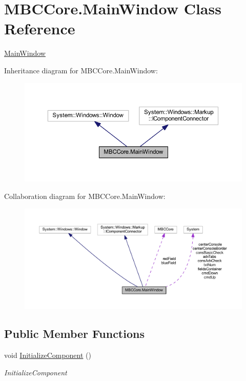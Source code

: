 \hypertarget{class_m_b_c_core_1_1_main_window}{\section{M\-B\-C\-Core.\-Main\-Window Class Reference}
\label{class_m_b_c_core_1_1_main_window}
}


\hyperlink{class_m_b_c_core_1_1_main_window}{Main\-Window}  




Inheritance diagram for M\-B\-C\-Core.\-Main\-Window\-:
\nopagebreak
\begin{figure}[H]
\begin{center}
\leavevmode
\includegraphics[width=350pt]{class_m_b_c_core_1_1_main_window__inherit__graph}
\end{center}
\end{figure}


Collaboration diagram for M\-B\-C\-Core.\-Main\-Window\-:
\nopagebreak
\begin{figure}[H]
\begin{center}
\leavevmode
\includegraphics[width=350pt]{class_m_b_c_core_1_1_main_window__coll__graph}
\end{center}
\end{figure}
\subsection*{Public Member Functions}
\begin{DoxyCompactItemize}
\item 
void \hyperlink{class_m_b_c_core_1_1_main_window_a340dd4c5fac56c53b718b1f3cb296cd2}{Initialize\-Component} ()
\begin{DoxyCompactList}\small\item\em Initialize\-Component \end{DoxyCompactList}\end{DoxyCompactItemize}


